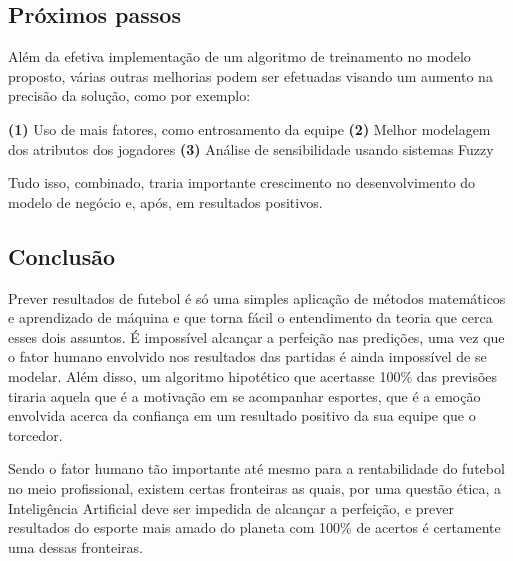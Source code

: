 \subsection{Próximos passos}

Além da efetiva implementação de um algoritmo de treinamento no modelo proposto, várias outras melhorias podem ser efetuadas visando um aumento na precisão da solução, como por exemplo:

\textbf{(1)} Uso de mais fatores, como entrosamento da equipe
\textbf{(2)} Melhor modelagem dos atributos dos jogadores
\textbf{(3)} Análise de sensibilidade usando sistemas Fuzzy

Tudo isso, combinado, traria importante crescimento no desenvolvimento do modelo de negócio e, após, em resultados positivos.

\subsection{Conclusão}

Prever resultados de futebol é só uma simples aplicação de métodos matemáticos e aprendizado de máquina e que torna fácil o entendimento da teoria que cerca esses dois assuntos. É impossível alcançar a perfeição nas predições, uma vez que o fator humano envolvido nos resultados das partidas é ainda impossível de se modelar. Além disso, um algoritmo hipotético que acertasse 100\% das previsões tiraria aquela que é a motivação em se acompanhar esportes, que é a emoção envolvida acerca da confiança em um resultado positivo da sua equipe que o torcedor.

Sendo o fator humano tão importante até mesmo para a rentabilidade do futebol no meio profissional, existem certas fronteiras as quais, por uma questão ética, a Inteligência Artificial deve ser impedida de alcançar a perfeição, e prever resultados do esporte mais amado do planeta com 100\% de acertos é certamente uma dessas fronteiras.

